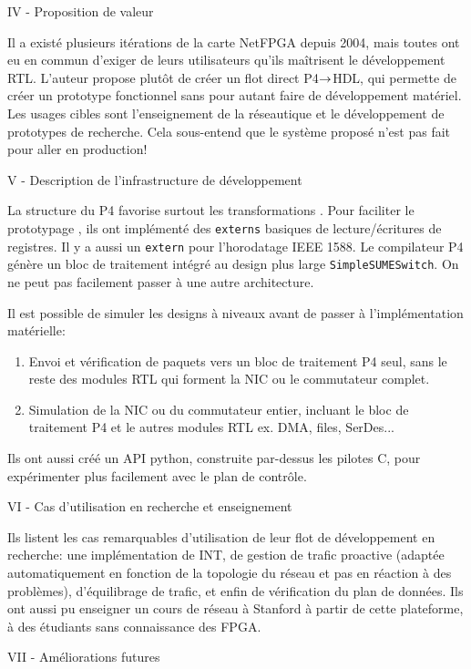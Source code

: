IV - Proposition de valeur

Il a existé plusieurs itérations de la carte NetFPGA depuis 2004, mais toutes ont eu en commun d'exiger de leurs utilisateurs qu'ils maîtrisent le développement RTL. L'auteur propose plutôt de créer un flot direct P4$\rightarrow$HDL, qui permette de créer un prototype fonctionnel sans pour autant faire de développement matériel. Les usages cibles sont l'enseignement de la réseautique et le développement de prototypes de recherche. Cela sous-entend que le système proposé n'est pas fait pour aller en production!

V - Description de l'infrastructure de développement

La structure du P4 favorise surtout les transformations . Pour faciliter le prototypage , ils ont implémenté des \texttt{externs} basiques de lecture/écritures de registres. Il y a aussi un \texttt{extern} pour l'horodatage IEEE 1588. Le compilateur P4 génère un bloc de traitement intégré au design plus large \texttt{SimpleSUMESwitch}. On ne peut pas facilement passer à une autre architecture.

Il est possible de simuler les designs à niveaux avant de passer à l'implémentation matérielle:
\begin{enumerate}
	\item Envoi et vérification de paquets vers un bloc de traitement P4 seul, sans le reste des modules RTL qui forment la NIC ou le commutateur complet.
	\item Simulation de la NIC ou du commutateur entier, incluant le bloc de traitement P4 et le autres modules RTL ex. DMA, files, SerDes...
\end{enumerate}

Ils ont aussi créé un API python, construite par-dessus les pilotes C, pour expérimenter plus facilement avec le plan de contrôle.

VI - Cas d'utilisation en recherche et enseignement

Ils listent les cas remarquables d'utilisation de leur flot de développement en recherche: une implémentation de INT, de gestion de trafic proactive (adaptée automatiquement en fonction de la topologie du réseau et pas en réaction à des problèmes), d'équilibrage de trafic, et enfin de vérification du plan de données. Ils ont aussi pu enseigner un cours de réseau à Stanford à partir de cette plateforme, à des étudiants sans connaissance des FPGA.

VII - Améliorations futures

